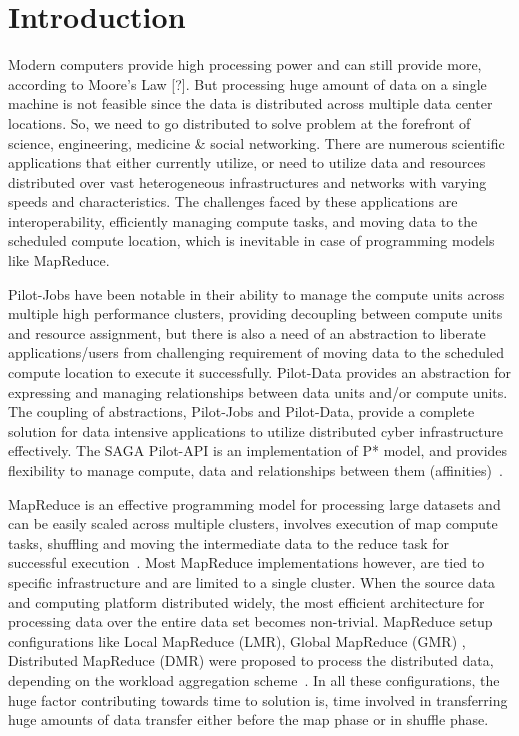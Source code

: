 \documentclass{acm_proc_article-sp}
\begin{document}


\section{Introduction}
Modern computers provide high processing power and can still provide more,
according to Moore's Law [?]. But processing huge amount of data on a single
machine is not feasible since the data is distributed across multiple data
center locations. So, we need to go distributed to solve problem at the
forefront of science, engineering, medicine \& social networking. There are
numerous scientific applications that either currently utilize, or need to
utilize data and resources distributed over vast heterogeneous infrastructures
and networks with varying speeds and characteristics. The challenges faced by
these applications are interoperability, efficiently managing compute tasks,
and moving data to the scheduled compute location, which is inevitable in case
of programming models like MapReduce.

Pilot-Jobs have been notable in their ability to manage the compute units
across multiple high performance clusters, providing decoupling between
compute units and resource assignment, but there is also a need of an
abstraction to liberate applications/users from challenging requirement of
moving data to the scheduled compute location to execute it successfully.
Pilot-Data provides an abstraction for expressing and managing relationships
between data units and/or compute units. The coupling of abstractions,
Pilot-Jobs and Pilot-Data, provide a complete solution for data intensive
applications to utilize distributed cyber infrastructure effectively. The SAGA
Pilot-API is an implementation of P* model, and provides flexibility to manage
compute, data and relationships between them (affinities)~\cite{pstar-2012}.

MapReduce is an effective programming model for processing large datasets and
can be easily scaled across multiple clusters, involves execution of map
compute tasks, shuffling and moving the intermediate data to the reduce task
for successful execution~\cite{Dean:2004:MSD:1251254.1251264}. Most MapReduce 
implementations however, are tied to
specific infrastructure and are limited to a single cluster. When the source
data and computing platform distributed widely, the most efficient
architecture for processing data over the entire data set becomes non-trivial.
MapReduce setup configurations like Local MapReduce (LMR), Global
MapReduce (GMR) , Distributed MapReduce (DMR) were proposed to process the
distributed data, depending on the workload aggregation
scheme~\cite{weissman-mr-11}. In all these configurations, the huge factor
contributing towards time to solution is, time involved in transferring huge
amounts of data transfer either before the map phase or in shuffle phase.
\end{document}
